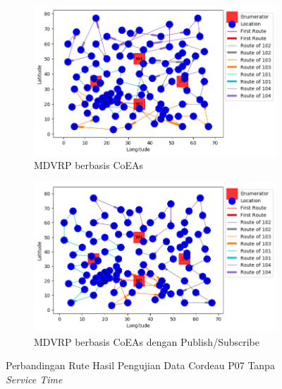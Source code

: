 \begin{figure}[!]
	\centering
	\begin{subfigure}[t]{\textwidth}
		\centering
		\includegraphics[width=\textwidth]{Resources/Images/test_result_cordeau_p07_notw_coes}
		\caption{MDVRP berbasis CoEAs}
		\label{fig:test_result_cordeau_p07_notw_coes}
	\end{subfigure}%
	
	\begin{subfigure}[t]{\textwidth}
		\centering
		\includegraphics[width=\textwidth]{Resources/Images/test_result_cordeau_p07_notw_pubsub_coes}
		\caption{MDVRP berbasis CoEAs dengan Publish/Subscribe}
		\label{fig:test_result_cordeau_p07_notw_pubsub_coes}
	\end{subfigure}
	\caption{Perbandingan Rute Hasil Pengujian Data Cordeau P07 Tanpa \textit{Service Time}}
	\label{fig:test_result_cordeau_p07_notw}
\end{figure}


